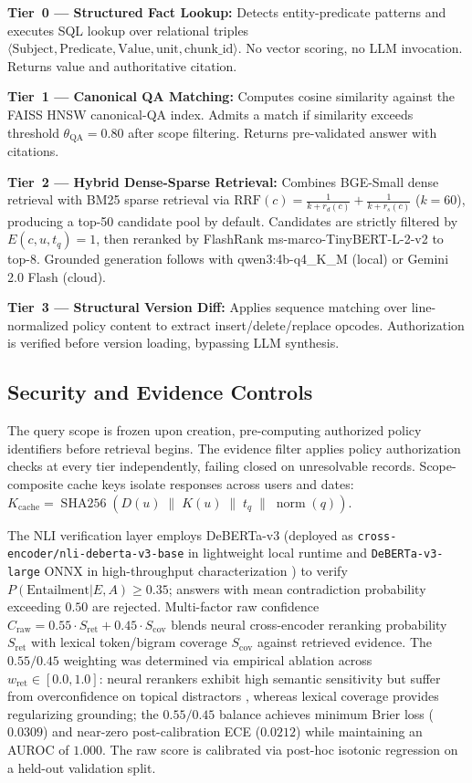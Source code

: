 \documentclass[journal]{IEEEtran}
\begin{document}
\textbf{Tier~0 --- Structured Fact Lookup:} Detects entity-predicate patterns and executes SQL lookup over relational triples $\langle\text{Subject},\text{Predicate},\text{Value},\text{unit},\text{chunk\_id}\rangle$. No vector scoring, no LLM invocation. Returns value and authoritative citation.

\textbf{Tier~1 --- Canonical QA Matching:} Computes cosine similarity against the FAISS HNSW canonical-QA index. Admits a match if similarity exceeds threshold $\theta_{\text{QA}}=0.80$ after scope filtering. Returns pre-validated answer with citations.

\textbf{Tier~2 --- Hybrid Dense-Sparse Retrieval:} Combines BGE-Small dense retrieval with BM25 sparse retrieval via $\text{RRF}(c)=\frac{1}{k+r_d(c)}+\frac{1}{k+r_s(c)}$ ($k=60$), producing a top-50 candidate pool by default. Candidates are strictly filtered by $E(c,u,t_q)=1$, then reranked by FlashRank ms-marco-TinyBERT-L-2-v2 to top-8. Grounded generation follows with qwen3:4b-q4\_K\_M (local) or Gemini 2.0 Flash (cloud).

\textbf{Tier~3 --- Structural Version Diff:} Applies sequence matching over line-normalized policy content to extract insert/delete/replace opcodes. Authorization is verified before version loading, bypassing LLM synthesis.

\subsection{Security and Evidence Controls}
The query scope is frozen upon creation, pre-computing authorized policy identifiers before retrieval begins. The evidence filter applies policy authorization checks at every tier independently, failing closed on unresolvable records. Scope-composite cache keys isolate responses across users and dates: $K_{\text{cache}}=\operatorname{SHA256}(D(u)\;\|\;K(u)\;\|\;t_q\;\|\;\operatorname{norm}(q))$.

The NLI verification layer employs DeBERTa-v3 (deployed as \texttt{cross-encoder/}\allowbreak\texttt{nli-deberta-v3-base} in lightweight local runtime and \texttt{DeBERTa-v3-large} ONNX in high-throughput characterization \cite{he2021deberta}) to verify $P(\text{Entailment}|E,A)\ge 0.35$; answers with mean contradiction probability exceeding $0.50$ are rejected. Multi-factor raw confidence $C_{\text{raw}}=0.55\cdot S_{\text{ret}}+0.45\cdot S_{\text{cov}}$ blends neural cross-encoder reranking probability $S_{\text{ret}}$ with lexical token/bigram coverage $S_{\text{cov}}$ against retrieved evidence. The $0.55/0.45$ weighting was determined via empirical ablation across $w_{\text{ret}} \in [0.0, 1.0]$: neural rerankers exhibit high semantic sensitivity but suffer from overconfidence on topical distractors \cite{guo2017calibration}, whereas lexical coverage provides regularizing grounding; the $0.55/0.45$ balance achieves minimum Brier loss ($0.0309$) and near-zero post-calibration ECE ($0.0212$) while maintaining an AUROC of $1.000$. The raw score is calibrated via post-hoc isotonic regression on a held-out validation split.
\end{document}
